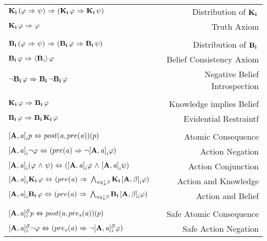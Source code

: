 \begin{table}[H]
\begin{center}
\begin{tabular}{| l r |}
	\hline
    $\Kns{i}(\varphi \iimplies \psi) \iimplies (\Kns{i}\varphi \iimplies \Kns{i}\psi)$ & Distribution of $\Kns{i}$ \\
    $\Kns{i}\varphi \iimplies \varphi$ & Truth Axiom \\
    &\\
    $\Bels{i}(\varphi \iimplies \psi) \iimplies (\Bels{i}\varphi \iimplies \Bels{i}\psi)$ & Distribution of $\Bels{i}$\\
    $\Bels{i}\varphi \iimplies \BPoss{i}\varphi$ & Belief Consistency Axiom\\
    $\tlnot\Bels{i}\varphi \iimplies \Bels{i}\tlnot\Bels{i}\varphi$ & Negative Belief Introspection\\
    &\\
    $\Kns{i}\varphi \iimplies \Bels{i}\varphi$ & Knowledge implies Belief \\
    $\Bels{i}\varphi \iimplies \Bels{i}\Kns{i}\varphi$ & Evidential Restraintf\\
	&\\
    $\Pal{A,\laa}p \iiff post(\laa, pre(\laa))(p)$ & Atomic Consequence\\
    $\Pal{A,\laa}\tlnot \varphi \iiff (pre(\laa) \iimplies \tlnot \Pal{A,\laa}\varphi)$ & Action Negation\\
    $\Pal{A,\laa}(\varphi \tland \psi) \iiff (\Pal{A,\laa}\varphi \tland \Pal{A,\laa}\psi)$ & Action Conjunction\\
    $\Pal{A,\laa}\Kns{i}\varphi \iiff (pre(\laa)\iimplies \bigwedge_{\laa\chi_{k}^i\beta}\Kns{i}\Pal{A,\beta}\varphi)$ & Action and Knowledge\\
    $\Pal{A,\laa}\Bels{i}\varphi \iiff (pre(\laa)\iimplies \bigwedge_{\laa\chi_{b}^i\beta}\Bels{i}\Pal{A,\beta}\varphi)$ & Action and Belief\\    
    &\\
    $\SPal{A,\laa}p \iiff post(\laa, pre_s(\laa))(p)$ & Safe Atomic Consequence\\
    $\SPal{A,\laa}\tlnot \varphi \iiff (pre_s(\laa) \iimplies \tlnot \SPal{A,\laa}\varphi)$ & Safe Action Negation\\

\end{tabular}
\end{center}
\end{table}
